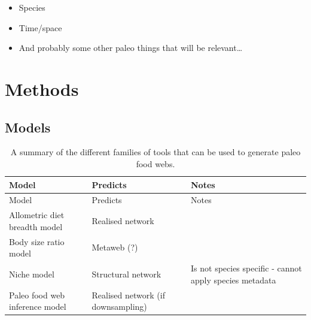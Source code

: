 \documentclass[
]{article}
\begin{document}
\begin{itemize}
\item
  Species
\item
  Time/space
\item
  And probably some other paleo things that will be relevant\ldots{}
\end{itemize}

\section{Methods}\label{methods}

\subsection{Models}\label{models}

\begin{longtable}[]{@{}
  >{\raggedright\arraybackslash}p{}
  >{\raggedright\arraybackslash}p{}
  >{\raggedright\arraybackslash}p{}@{}}
\caption{A summary of the different families of tools that can be used
to generate paleo food webs.}\label{tbl-models}\tabularnewline
\toprule\noalign{}
\begin{minipage}[b]{\linewidth}\raggedright
Model
\end{minipage} & \begin{minipage}[b]{\linewidth}\raggedright
Predicts
\end{minipage} & \begin{minipage}[b]{\linewidth}\raggedright
Notes
\end{minipage} \\
\midrule\noalign{}
\endfirsthead
\toprule\noalign{}
\begin{minipage}[b]{\linewidth}\raggedright
Model
\end{minipage} & \begin{minipage}[b]{\linewidth}\raggedright
Predicts
\end{minipage} & \begin{minipage}[b]{\linewidth}\raggedright
Notes
\end{minipage} \\
\midrule\noalign{}
\endhead
\bottomrule\noalign{}
\endlastfoot
Allometric diet breadth model & Realised network & \\
Body size ratio model & Metaweb (?) & \\
Niche model & Structural network & Is not species specific - cannot
apply species metadata \\
Paleo food web inference model & Realised network (if downsampling) & \\
\end{longtable}
\end{document}
